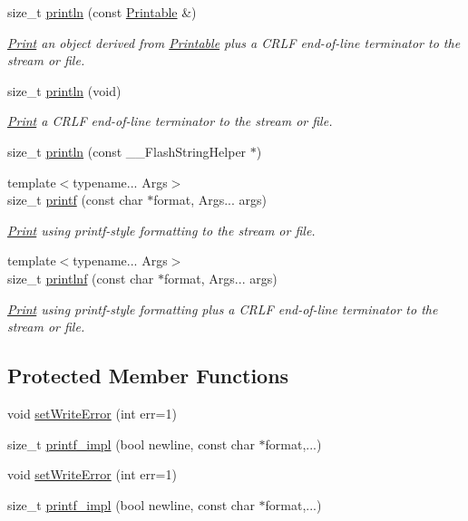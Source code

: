 \begin{DoxyCompactItemize}
size\+\_\+t \hyperlink{class_print_a20f9e104153b62e720c9b4c348b44f00}{println} (const \hyperlink{class_printable}{Printable} \&)
\begin{DoxyCompactList}\small\item\em \hyperlink{class_print}{Print} an object derived from \hyperlink{class_printable}{Printable} plus a C\+R\+LF end-\/of-\/line terminator to the stream or file. \end{DoxyCompactList}\item 
size\+\_\+t \hyperlink{class_print_a169b128f9e22f0c15883768f580541a2}{println} (void)
\begin{DoxyCompactList}\small\item\em \hyperlink{class_print}{Print} a C\+R\+LF end-\/of-\/line terminator to the stream or file. \end{DoxyCompactList}\item 
size\+\_\+t \hyperlink{class_print_a4fd286b325d3b1a786cfa35072a8ef52}{println} (const \+\_\+\+\_\+\+Flash\+String\+Helper $\ast$)
\item 
{\footnotesize template$<$typename... Args$>$ }\\size\+\_\+t \hyperlink{class_print_a08a461c9fee5fd8f5795d6e9f61e3d5b}{printf} (const char $\ast$format, Args... args)
\begin{DoxyCompactList}\small\item\em \hyperlink{class_print}{Print} using printf-\/style formatting to the stream or file. \end{DoxyCompactList}\item 
{\footnotesize template$<$typename... Args$>$ }\\size\+\_\+t \hyperlink{class_print_afa41aa5211c54b7b4d79b9286880c337}{printlnf} (const char $\ast$format, Args... args)
\begin{DoxyCompactList}\small\item\em \hyperlink{class_print}{Print} using printf-\/style formatting plus a C\+R\+LF end-\/of-\/line terminator to the stream or file. \end{DoxyCompactList}\end{DoxyCompactItemize}
\subsection*{Protected Member Functions}
\begin{DoxyCompactItemize}
\item 
void \hyperlink{class_print_a46656410e23c0ec14d7a01b38b3b6f00}{set\+Write\+Error} (int err=1)
\item 
size\+\_\+t \hyperlink{class_print_af887fd768601c2ee2b18d1deb20b151d}{printf\+\_\+impl} (bool newline, const char $\ast$format,...)
\item 
void \hyperlink{class_print_a46656410e23c0ec14d7a01b38b3b6f00}{set\+Write\+Error} (int err=1)
\item 
size\+\_\+t \hyperlink{class_print_af887fd768601c2ee2b18d1deb20b151d}{printf\+\_\+impl} (bool newline, const char $\ast$format,...)
\end{DoxyCompactItemize}
